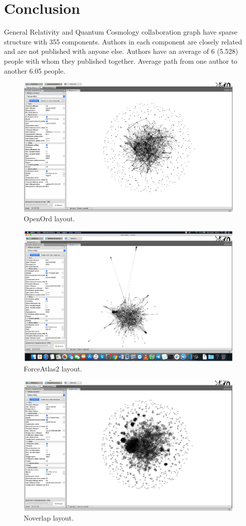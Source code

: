 \documentclass[a4paper,article,14pt]{extarticle}
\begin{document}
	\section{Conclusion}
	
	General Relativity and Quantum Cosmology collaboration graph have sparse structure with 355 components. Authors in each component are closely related and are not published with anyone else. Authors have an average of 6 (5.528) people with whom they published together. Average path from one author to another 6.05 people.
	
	\begin{figure}[h!]
		\centering
		\includegraphics[scale=0.5]{openord.png}
		\caption{OpenOrd layout.}
		\label{openord}
	\end{figure} 
	
	\begin{figure}[h!]
		\centering
		\includegraphics[scale=0.5]{forceatlas.png}
		\caption{ForceAtlas2 layout.}
		\label{force}
	\end{figure}
	
	\begin{figure}[h!]
		\centering
		\includegraphics[scale=0.5]{noverlap.png}
		\caption{Noverlap layout.}
		\label{noverlap}
	\end{figure}
	
\end{document}
